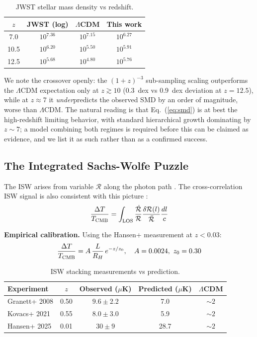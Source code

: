 \documentclass[12pt]{article}
\begin{document}
\begin{table}[H]
\centering
\caption{JWST stellar mass density vs redshift.}
\begin{tabular}{cccc}
\hline
$z$ & JWST (log) & $\Lambda$CDM & This work \\
\hline
7.0 & $10^{7.36}$ & $10^{7.15}$ & $10^{6.27}$ \\
10.5 & $10^{6.20}$ & $10^{5.50}$ & $10^{5.91}$ \\
12.5 & $10^{5.68}$ & $10^{4.80}$ & $10^{5.76}$ \\
\hline
\end{tabular}
\end{table}

We note the crossover openly: the $(1+z)^{-3}$ sub-sampling scaling outperforms the $\Lambda$CDM expectation only at $z \gtrsim 10$ (0.3~dex vs 0.9~dex deviation at $z=12.5$), while at $z \approx 7$ it \emph{under}predicts the observed SMD by an order of magnitude, worse than $\Lambda$CDM. The natural reading is that Eq.~(\ref{eq:smd}) is at best the high-redshift limiting behavior, with standard hierarchical growth dominating by $z \sim 7$; a model combining both regimes is required before this can be claimed as evidence, and we list it as such rather than as a confirmed success.

\subsection{The Integrated Sachs-Wolfe Puzzle}
The ISW arises from variable $\mathcal{R}$ along the photon path \citep{sachs1967}. The cross-correlation ISW signal is also consistent with this picture \citep{krolewski2022}:
\begin{equation}
\frac{\Delta T}{T_{\rm CMB}} = \int_{\rm LOS} \frac{\dot{\mathcal{R}}}{\mathcal{R}} \frac{\delta\mathcal{R}(l)}{\bar{\mathcal{R}}} \frac{dl}{c}
\end{equation}

{\bf Empirical calibration.} Using the Hansen+ \cite{hansen2025} measurement at $z<0.03$:
\begin{equation}
\frac{\Delta T}{T_{\rm CMB}} = A\,\frac{L}{R_H}\,e^{-z/z_0},\quad A = 0.0024,\ z_0 = 0.30
\end{equation}

\begin{table}[H]
\centering
\caption{ISW stacking measurements vs prediction.}
\begin{tabular}{lcccc}
\hline
Experiment & $z$ & Observed ($\mu$K) & Predicted ($\mu$K) & $\Lambda$CDM \\
\hline
Granett+ 2008 \citep{granett2008} & 0.50 & $9.6\pm2.2$ & 7.0 & $\sim2$ \\
Kovacs+ 2021 \citep{kovacs2021} & 0.55 & $8.0\pm3.0$ & 5.9 & $\sim2$ \\
Hansen+ 2025 \citep{hansen2025} & 0.01 & $30\pm9$ & 28.7 & $\sim2$ \\
\hline
\end{tabular}
\end{table}
\end{document}
